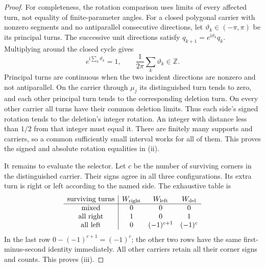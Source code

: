 \begin{proof}
For completeness, the rotation comparison uses limits of every affected
turn, not equality of finite-parameter angles. For a closed polygonal
carrier with nonzero segments and no antiparallel consecutive directions,
let $\vartheta_k\in(-\pi,\pi)$ be its principal turns. The successive
unit directions satisfy $q_{k+1}=e^{\mathrm i\vartheta_k}q_k$.
Multiplying around the closed cycle gives
\begin{equation}\label{flatpr:rotation-integer}
e^{\mathrm i\sum_k\vartheta_k}=1,\qquad
\frac1{2\pi}\sum_k\vartheta_k\in\mathbb Z.
\end{equation}
Principal turns are continuous when the two incident directions are
nonzero and not antiparallel. On the carrier through $\mu_j$ its
distinguished turn tends to zero, and each other principal turn tends
to the corresponding deletion turn. On every other carrier all turns
have their common deletion limits. Thus each side's signed rotation
tends to the deletion's integer rotation. An integer with distance
less than $1/2$ from that integer must equal it. There are finitely
many supports and carriers, so a common sufficiently small interval
works for all of them. This proves the signed and absolute rotation
equalities in (ii).

It remains to evaluate the selector. Let $c$ be the number of surviving
corners in the distinguished carrier. Their signs agree in all three
configurations. Its extra turn is right or left according to the named
side. The exhaustive table is
\begin{equation}\label{flatpr:selector-table}
\begin{array}{c|ccc}
\text{surviving turns}&W_{\rm right}&W_{\rm left}&W_{\rm del}\\\hline
\text{mixed}&0&0&0\\
\text{all right}&1&0&1\\
\text{all left}&0&(-1)^{c+1}&(-1)^c
\end{array}
\end{equation}
In the last row $0-(-1)^{c+1}=(-1)^c$; the other two rows have the
same first-minus-second identity immediately. All other carriers
retain all their corner signs and counts. This proves (iii).
\end{proof}


